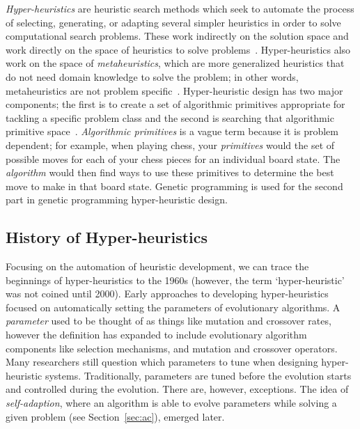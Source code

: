 \documentclass{sig-alternate}
\begin{document}
\textit{Hyper-heuristics} are heuristic search methods which seek to automate the process of selecting, generating, or adapting several simpler heuristics in order to solve computational search problems. These work indirectly on the solution space and work directly on the space of heuristics to solve problems~\cite{tauritz:tutorial}. Hyper-heuristics also work on the space of \textit{metaheuristics}, which are more generalized heuristics that do not need domain knowledge to solve the problem; in other words, metaheuristics are not problem specific~\cite{tauritz:tutorial}. Hyper-heuristic design has two major components; the first is to create a set of algorithmic primitives appropriate for tackling a specific problem class and the second is searching that algorithmic primitive space~\cite{harris:2015}. \textit{Algorithmic primitives} is a vague term because it is problem dependent; for example, when playing chess, your \textit{primitives} would the set of possible moves for each of your chess pieces for an individual board state. The \textit{algorithm} would then find ways to use these primitives to determine the best move to make in that board state. Genetic programming is used for the second part in genetic programming hyper-heuristic design.

\subsection{History of Hyper-heuristics}
\label{sec:history}

Focusing on the automation of heuristic development, we can trace the beginnings of hyper-heuristics to the 1960s (however, the term `hyper-heuristic' was not coined until 2000). Early approaches to developing hyper-heuristics focused on automatically setting the parameters of evolutionary algorithms. A \textit{parameter} used to be thought of as things like mutation and crossover rates, however the definition has expanded to include evolutionary algorithm components like selection mechanisms, and mutation and crossover operators. Many researchers still question which parameters to tune when designing hyper-heuristic systems. Traditionally, parameters are tuned before the evolution starts and controlled during the evolution. There are, however, exceptions. The idea of \textit{self-adaption}, where an algorithm is able to evolve parameters while solving a given problem (see Section~\ref{sec:ac}), emerged later.~\cite{pappa:2014}
\end{document}
